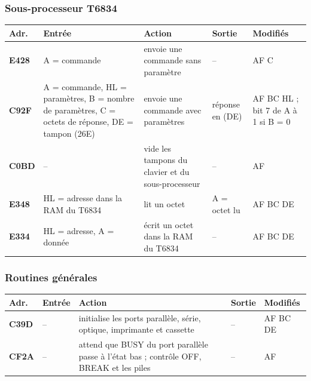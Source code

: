 \documentclass[a4paper,10pt]{article}
\makeatletter
\newenvironment{routines}
  {\small\begin{longtable}{@{}>{\ttfamily\bfseries}p{1.1cm}>{\raggedright}p{4.0cm}>{\raggedright}p{5.0cm}>{\raggedright}p{3.1cm}>{\raggedright\arraybackslash}p{2.1cm}@{}}
   \toprule
   \normalfont\bfseries Adr. & \textbf{Entrée} & \textbf{Action} & \textbf{Sortie} & \textbf{Modifiés}\\
   \midrule\endhead
   \bottomrule\endfoot}
  {\end{longtable}}
\makeatother
\begin{document}
\subsubsection*{Sous-processeur T6834}
\begin{routines}
E428 & A = commande & envoie une commande sans paramètre & -- & AF C \\
C92F & A = commande, HL = paramètres, B = nombre de paramètres, C = octets de réponse, DE = tampon (26E) & envoie une commande avec paramètres & réponse en (DE) & AF BC HL ; bit 7 de A à 1 si B = 0 \\
C0BD & -- & vide les tampons du clavier et du sous-processeur & -- & AF \\
E348 & HL = adresse dans la RAM du T6834 & lit un octet & A = octet lu & AF BC DE \\
E334 & HL = adresse, A = donnée & écrit un octet dans la RAM du T6834 & -- & AF BC DE \\
\end{routines}

\subsubsection*{Routines générales}
\begin{routines}
C39D & -- & initialise les ports parallèle, série, optique, imprimante et cassette & -- & AF BC DE \\
CF2A & -- & attend que BUSY du port parallèle passe à l'état bas ; contrôle OFF, BREAK et les piles & -- & AF \\
\end{routines}
\end{document}

